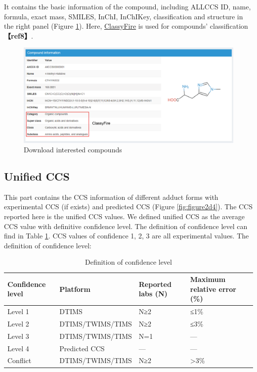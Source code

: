 \documentclass[12pt,]{book}
\begin{document}
It contains the basic information of the compound, including ALLCCS ID,
name, formula, exact mass, SMILES, InChI, InChIKey, classification and
structure in the right panel (Figure \ref{fig:figure2d3}). Here,
\href{http://classyfire.wishartlab.com}{ClassyFire} is used for
compounds' classification \textbf{【ref8】}.

\begin{figure}

{\centering \includegraphics{images/chapter2/figure2.3compound_card_information} 

}

\caption{Download interested compounds}\label{fig:figure2d3}
\end{figure}

\subsection{Unified CCS}\label{chapter2d2d2}

This part contains the CCS information of different adduct forms with
experimental CCS (if exists) and predicted CCS (Figure
\ref{fig:figure2d4}). The CCS reported here is the unified CCS values.
We defined unified CCS as the average CCS value with definitive
confidence level. The definition of confidence level can find in Table
\ref{tab:table2d2}. CCS values of confidence 1, 2, 3 are all
experimental values. The definition of confidence level:

\begin{table}

\caption{\label{tab:table2d2}Definition of confidence level}
\centering
\begin{tabular}[t]{llll}
\toprule
Confidence level & Platform & Reported labs (N) & Maximum relative error (\%)\\
\midrule
Level 1 & DTIMS & N≥2 & ≤1\%\\
Level 2 & DTIMS/TWIMS/TIMS & N≥2 & ≤3\%\\
Level 3 & DTIMS/TWIMS/TIMS & N=1 & ---\\
Level 4 & Predicted CCS & --- & ---\\
Conflict & DTIMS/TWIMS/TIMS & N≥2 & >3\%\\
\bottomrule
\end{tabular}
\end{table}
\end{document}

